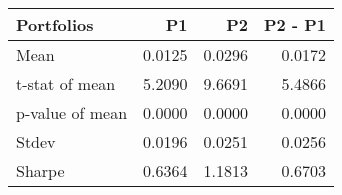 \begin{tabular}{lrrr}
\toprule
Portfolios & P1 & P2 & P2 - P1 \\
\midrule
Mean & 0.0125 & 0.0296 & 0.0172 \\
t-stat of mean & 5.2090 & 9.6691 & 5.4866 \\
p-value of mean & 0.0000 & 0.0000 & 0.0000 \\
Stdev & 0.0196 & 0.0251 & 0.0256 \\
Sharpe & 0.6364 & 1.1813 & 0.6703 \\
\bottomrule
\end{tabular}
